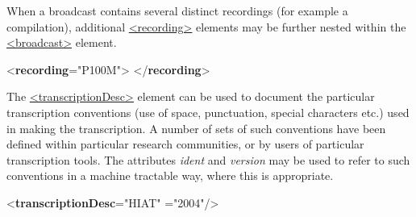 When a broadcast contains several distinct recordings (for example a compilation), additional \hyperref[TEI.recording]{<recording>} elements may be further nested within the \hyperref[TEI.broadcast]{<broadcast>} element. \par\bgroup{}\exampleFont \begin{shaded}\noindent\mbox{}{<\textbf{recording}\hspace*{1em}{dur}="{P100M}">}\mbox{}\newline 
{}\mbox{}\newline 
\hspace*{1em}\mbox{}\newline 
{}\mbox{}\newline 
{</\textbf{recording}>}\end{shaded}\egroup\par \noindent   \par
The \hyperref[TEI.transcriptionDesc]{<transcriptionDesc>} element can be used to document the particular transcription conventions (use of space, punctuation, special characters etc.) used in making the transcription. A number of sets of such conventions have been defined within particular research communities, or by users of particular transcription tools. The attributes {\itshape ident} and {\itshape version} may be used to refer to such conventions in a machine tractable way, where this is appropriate. \par\bgroup{}\exampleFont \begin{shaded}\noindent\mbox{}{<\textbf{transcriptionDesc}\hspace*{1em}{ident}="{HIAT}"\mbox{}\newline 
\hspace*{1em}{version}="{2004}"/>}\end{shaded}\egroup\par 
